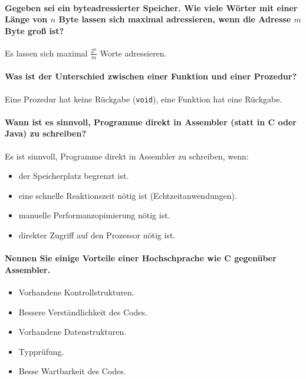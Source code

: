         \paragraph{Gegeben sei ein byteadressierter Speicher. Wie viele Wörter mit einer Länge von $ n $ Byte lassen sich maximal adressieren, wenn die Adresse $ m $ Byte groß ist?}
            Es lassen sich maximal $ \frac{2 ^ n}{m} $ Worte adressieren.

        \paragraph{Was ist der Unterschied zwischen einer Funktion und einer Prozedur?}
            Eine Prozedur hat keine Rückgabe (\texttt{void}), eine Funktion hat eine Rückgabe.

        \paragraph{Wann ist es sinnvoll, Programme direkt in Assembler (statt in C oder Java) zu schreiben?}
            Es ist sinnvoll, Programme direkt in Assembler zu schreiben, wenn:
            \begin{itemize}
                \item der Speicherplatz begrenzt ist.
                \item eine schnelle Reaktionszeit nötig ist (Echtzeitanwendungen).
                \item manuelle Performanzopimierung nötig ist.
                \item direkter Zugriff auf den Prozessor nötig ist.
            \end{itemize}

        \paragraph{Nennen Sie einige Vorteile einer Hochschprache wie C gegenüber Assembler.}
            \begin{itemize}
                \item Vorhandene Kontrollstrukturen.
                \item Bessere Verständlichkeit des Codes.
                \item Vorhandene Datenstrukturen.
                \item Typprüfung.
                \item Besse Wartbarkeit des Codes.
            \end{itemize}

